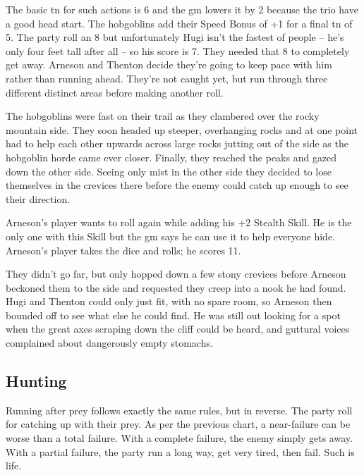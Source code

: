 \begin{multicols}{2}
{\begin{exampletext}
	The basic \gls{tn} for such actions is 6 and the \gls{gm} lowers it by 2 because the trio have a good head start.
	The hobgoblins add their Speed Bonus of +1 for a final \gls{tn} of 5.
	The party roll an 8 but unfortunately Hugi isn't the fastest of people -- he's only four feet tall after all -- so his score is 7.
	They needed that 8 to completely get away.
	Arneson and Thenton decide they're going to keep pace with him rather than running ahead.
	They're not caught yet, but run through three different distinct areas before making another roll.

The hobgoblins were fast on their trail as they clambered over the rocky mountain side.
They soon headed up steeper, overhanging rocks and at one point had to help each other upwards across large rocks jutting out of the side as the hobgoblin horde came ever closer.
Finally, they reached the peaks and gazed down the other side.
Seeing only mist in the other side they decided to lose themselves in the crevices there before the enemy could catch up enough to see their direction.

	Arneson's player wants to roll again while adding his +2 Stealth Skill. He is the only one with this Skill but the \gls{gm} says he can use it to help everyone hide.  Arneson's player takes the dice and rolls; he scores 11.

	They didn't go far, but only hopped down a few stony crevices before Arneson beckoned them to the side and requested they creep into a nook he had found.
Hugi and Thenton could only just fit, with no spare room, so Arneson then bounded off to see what else he could find.
He was still out looking for a spot when the great axes scraping down the cliff could be heard, and guttural voices complained about dangerously empty stomachs.
\end{exampletext}
}{}

\subsection{Hunting}

Running after prey follows exactly the same rules, but in reverse.
The party roll for catching up with their prey.
As per the previous chart, a near-failure can be worse than a total failure.
With a complete failure, the enemy simply gets away.
With a partial failure, the party run a long way, get very tired, then fail.
Such is life.

\end{multicols}

